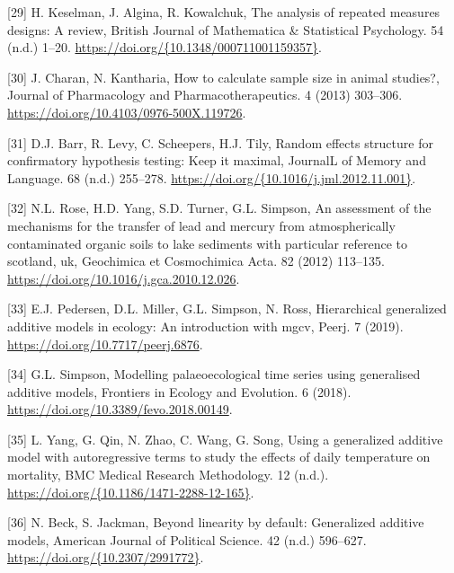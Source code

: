 \documentclass[
]{article}
\begin{document}
\leavevmode\hypertarget{ref-keselman2001}{}%
{[}29{]} H. Keselman, J. Algina, R. Kowalchuk, The analysis of repeated measures designs: A review, British Journal of Mathematica \& Statistical Psychology. 54 (n.d.) 1--20. \href{https://doi.org/\%7B10.1348/000711001159357\%7D}{https://doi.org/\{10.1348/000711001159357\}}.

\leavevmode\hypertarget{ref-charan2013}{}%
{[}30{]} J. Charan, N. Kantharia, How to calculate sample size in animal studies?, Journal of Pharmacology and Pharmacotherapeutics. 4 (2013) 303--306. \url{https://doi.org/10.4103/0976-500X.119726}.

\leavevmode\hypertarget{ref-barr2013}{}%
{[}31{]} D.J. Barr, R. Levy, C. Scheepers, H.J. Tily, Random effects structure for confirmatory hypothesis testing: Keep it maximal, JournalL of Memory and Language. 68 (n.d.) 255--278. \href{https://doi.org/\%7B10.1016/j.jml.2012.11.001\%7D}{https://doi.org/\{10.1016/j.jml.2012.11.001\}}.

\leavevmode\hypertarget{ref-rose2012}{}%
{[}32{]} N.L. Rose, H.D. Yang, S.D. Turner, G.L. Simpson, An assessment of the mechanisms for the transfer of lead and mercury from atmospherically contaminated organic soils to lake sediments with particular reference to scotland, uk, Geochimica et Cosmochimica Acta. 82 (2012) 113--135. \url{https://doi.org/10.1016/j.gca.2010.12.026}.

\leavevmode\hypertarget{ref-pedersen2019}{}%
{[}33{]} E.J. Pedersen, D.L. Miller, G.L. Simpson, N. Ross, Hierarchical generalized additive models in ecology: An introduction with mgcv, Peerj. 7 (2019). \url{https://doi.org/10.7717/peerj.6876}.

\leavevmode\hypertarget{ref-simpson2018}{}%
{[}34{]} G.L. Simpson, Modelling palaeoecological time series using generalised additive models, Frontiers in Ecology and Evolution. 6 (2018). \url{https://doi.org/10.3389/fevo.2018.00149}.

\leavevmode\hypertarget{ref-yang2012}{}%
{[}35{]} L. Yang, G. Qin, N. Zhao, C. Wang, G. Song, Using a generalized additive model with autoregressive terms to study the effects of daily temperature on mortality, BMC Medical Research Methodology. 12 (n.d.). \href{https://doi.org/\%7B10.1186/1471-2288-12-165\%7D}{https://doi.org/\{10.1186/1471-2288-12-165\}}.

\leavevmode\hypertarget{ref-beck1998}{}%
{[}36{]} N. Beck, S. Jackman, Beyond linearity by default: Generalized additive models, American Journal of Political Science. 42 (n.d.) 596--627. \href{https://doi.org/\%7B10.2307/2991772\%7D}{https://doi.org/\{10.2307/2991772\}}.
\end{document}
